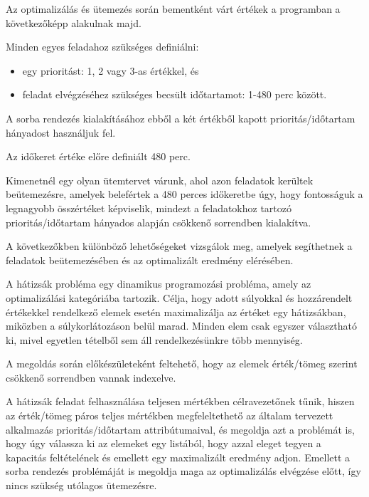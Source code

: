 Az optimalizálás és ütemezés során bementként várt értékek a programban a következőképp alakulnak majd.

Minden egyes feladahoz szükséges definiálni:

\begin{itemize}
\item egy prioritást: 1, 2 vagy 3-as értékkel, és
\item feladat elvégzéséhez szükséges becsült időtartamot: 1-480 perc között.
\end{itemize}

A sorba rendezés kialakításához ebből a két értékből kapott prioritás/időtartam hányadost használjuk fel.

Az időkeret értéke előre definiált 480 perc.

Kimenetnél egy olyan ütemtervet várunk, ahol azon feladatok kerültek beütemezésre, amelyek belefértek a 480 perces időkeretbe úgy, hogy fontosságuk a legnagyobb összértéket képviselik, mindezt a feladatokhoz tartozó prioritás/időtartam hányados alapján csökkenő sorrendben kialakítva.

A következőkben különböző lehetőségeket vizsgálok meg, amelyek segíthetnek a feladatok beütemezésében és az optimalizált eredmény elérésében.


A hátizsák probléma egy dinamikus programozási probléma, amely az optimalizálási kategóriába tartozik. Célja, hogy adott súlyokkal és hozzárendelt értékekkel rendelkező elemek esetén maximalizálja az értéket egy hátizsákban, miközben a súlykorlátozáson belül marad. Minden elem csak egyszer választható ki, mivel egyetlen tételből sem áll rendelkezésünkre több mennyiség.\cite{knapsack}

A megoldás során előkészületeként feltehető, hogy az elemek érték/tömeg szerint csökkenő sorrendben vannak indexelve.

A hátizsák feladat felhasználása teljesen mértékben célravezetőnek tűnik, hiszen az érték/tömeg páros teljes mértékben megfeleltethető az általam tervezett alkalmazás prioritás/időtartam attribútumaival, és megoldja azt a problémát is, hogy úgy válassza ki az elemeket egy listából, hogy azzal eleget tegyen a kapacitás feltételének és emellett egy maximalizált eredmény adjon. Emellett a sorba rendezés problémáját is megoldja maga az optimalizálás elvégzése előtt, így nincs szükség utólagos ütemezésre.


